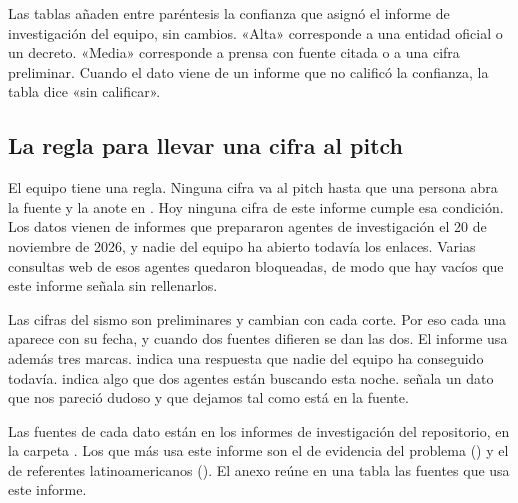 Las tablas añaden entre paréntesis la confianza que asignó el informe de investigación del equipo, sin cambios. «Alta» corresponde a una entidad oficial o un decreto. «Media» corresponde a prensa con fuente citada o a una cifra preliminar. Cuando el dato viene de un informe que no calificó la confianza, la tabla dice «sin calificar».

\subsection{La regla para llevar una cifra al pitch}

El equipo tiene una regla. Ninguna cifra va al pitch hasta que una persona abra la fuente y la anote en . Hoy ninguna cifra de este informe cumple esa condición. Los datos vienen de informes que prepararon agentes de investigación el 20 de noviembre de 2026, y nadie del equipo ha abierto todavía los enlaces. Varias consultas web de esos agentes quedaron bloqueadas, de modo que hay vacíos que este informe señala sin rellenarlos.

Las cifras del sismo son preliminares y cambian con cada corte. Por eso cada una aparece con su fecha, y cuando dos fuentes difieren se dan las dos. El informe usa además tres marcas. \pendiente{} indica una respuesta que nadie del equipo ha conseguido todavía. \eninvestigacion{} indica algo que dos agentes están buscando esta noche. \porverificar{} señala un dato que nos pareció dudoso y que dejamos tal como está en la fuente.

Las fuentes de cada dato están en los informes de investigación del repositorio, en la carpeta . Los que más usa este informe son el de evidencia del problema () y el de referentes latinoamericanos (). El anexo reúne en una tabla las fuentes que usa este informe.
